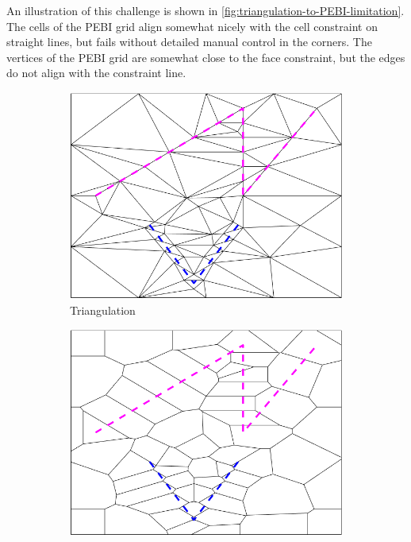 An illustration of this challenge is shown in \autoref{fig:triangulation-to-PEBI-limitation}. The cells of the PEBI grid align somewhat nicely with the cell constraint on straight lines, but fails without detailed manual control in the corners. The vertices of the PEBI grid are somewhat close to the face constraint, but the edges do not align with the constraint line.

\begin{figure}[ht]
    \centering
    \begin{subfigure}[b]{0.45\textwidth}
        \centering
        \includegraphics[width=\textwidth]{report/Images/Software/Gmsh limitations/gmsh_conversion_triangulation.png}
        \caption{Triangulation}
        \label{fig:limitation-triangulation}
    \end{subfigure}
    \begin{subfigure}[b]{0.45\textwidth}
        \centering
        \includegraphics[width=\textwidth]{report/Images/Software/Gmsh limitations/gmsh_conversion_PEBI.png}

\end{subfigure}
\end{figure}
